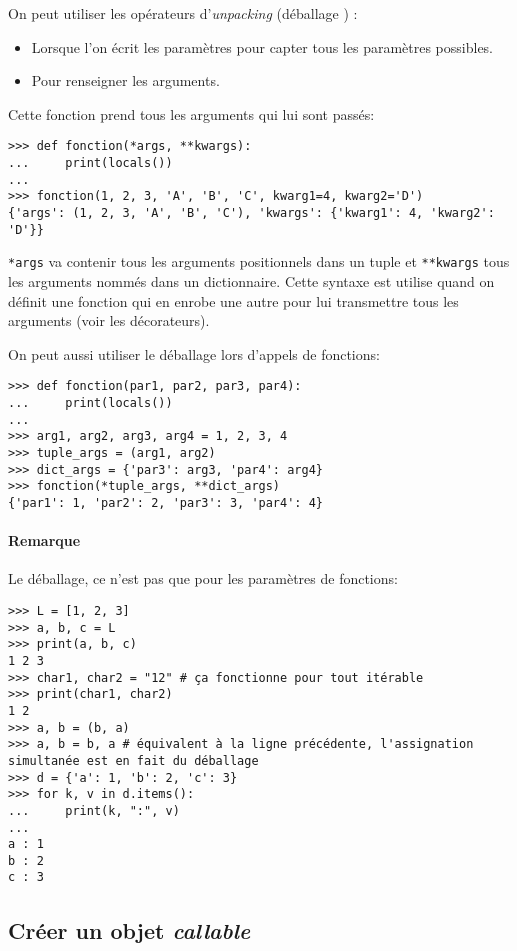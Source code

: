 On peut utiliser les opérateurs d'\emph{unpacking} (\og déballage \fg{}) :
\begin{itemize}
    \item Lorsque l'on écrit les paramètres pour capter tous les paramètres possibles.
    \item Pour renseigner les arguments.
\end{itemize}

Cette fonction prend tous les arguments qui lui sont passés:
\begin{verbatim}
>>> def fonction(*args, **kwargs):
...     print(locals())
...
>>> fonction(1, 2, 3, 'A', 'B', 'C', kwarg1=4, kwarg2='D')
{'args': (1, 2, 3, 'A', 'B', 'C'), 'kwargs': {'kwarg1': 4, 'kwarg2': 'D'}}
\end{verbatim}

\texttt{*args} va contenir tous les arguments positionnels dans un tuple et \texttt{**kwargs}
tous les arguments nommés dans un dictionnaire. Cette syntaxe est utilise quand on définit une fonction qui en enrobe une
autre pour lui transmettre tous les arguments (voir les décorateurs).\bigskip

On peut aussi utiliser le déballage lors d'appels de fonctions:
\begin{verbatim}
>>> def fonction(par1, par2, par3, par4):
...     print(locals())
...
>>> arg1, arg2, arg3, arg4 = 1, 2, 3, 4
>>> tuple_args = (arg1, arg2)
>>> dict_args = {'par3': arg3, 'par4': arg4}
>>> fonction(*tuple_args, **dict_args)
{'par1': 1, 'par2': 2, 'par3': 3, 'par4': 4}
\end{verbatim}

\paragraph*{Remarque} Le déballage, ce n'est pas que pour les paramètres de fonctions:
\begin{verbatim}
>>> L = [1, 2, 3]
>>> a, b, c = L
>>> print(a, b, c)
1 2 3
>>> char1, char2 = "12" # ça fonctionne pour tout itérable
>>> print(char1, char2)
1 2
>>> a, b = (b, a)
>>> a, b = b, a # équivalent à la ligne précédente, l'assignation simultanée est en fait du déballage
>>> d = {'a': 1, 'b': 2, 'c': 3}
>>> for k, v in d.items():
...     print(k, ":", v)
... 
a : 1
b : 2
c : 3
\end{verbatim}

\subsection{Créer un objet {\normalfont\bfseries\itshape callable}}

